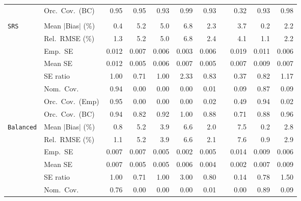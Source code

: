 \begin{landscape}
\begin{longtable}{llrrrrrrrrr}
 & Orc.\ Cov.\ (BC) & \cellcolor{rankone}0.95 & \cellcolor{rankone}0.95 & \cellcolor{ranktwo}0.93 & 0.99 & \cellcolor{ranktwo}0.93 &  & 0.32 & \cellcolor{ranktwo}0.93 & \cellcolor{rankthree}0.98 \\
\addlinespace[2pt]
\multicolumn{11}{l}{\textbf{Interaction}} \\
\addlinespace[2pt]
\quad \texttt{SRS} & Mean $|$Bias$|$ (\%) & \cellcolor{ranktwo}0.4 & 5.2 & 5.0 & 6.8 & 2.3 &  & 3.7 & \cellcolor{rankone}0.2 & \cellcolor{rankthree}2.2 \\
 & Rel.\ RMSE (\%) & \cellcolor{ranktwo}1.3 & 5.2 & 5.0 & 6.8 & 2.4 &  & 4.1 & \cellcolor{rankone}1.1 & \cellcolor{rankthree}2.2 \\
 & Emp.\ SE & 0.012 & 0.007 & 0.006 & 0.003 & 0.006 &  & 0.019 & 0.011 & 0.006 \\
 & Mean SE & 0.012 & 0.005 & 0.006 & 0.007 & 0.005 &  & 0.007 & 0.009 & 0.007 \\
 & SE ratio & \cellcolor{rankone}1.00 & 0.71 & \cellcolor{rankone}1.00 & 2.33 & \cellcolor{ranktwo}0.83 &  & 0.37 & \cellcolor{rankthree}0.82 & \cellcolor{ranktwo}1.17 \\
 & Nom.\ Cov. & \cellcolor{rankone}0.94 & 0.00 & 0.00 & 0.00 & 0.01 &  & \cellcolor{rankthree}0.09 & \cellcolor{ranktwo}0.87 & \cellcolor{rankthree}0.09 \\
 & Orc.\ Cov.\ (Emp) & \cellcolor{rankone}0.95 & 0.00 & 0.00 & 0.00 & 0.02 &  & \cellcolor{rankthree}0.49 & \cellcolor{ranktwo}0.94 & 0.02 \\
 & Orc.\ Cov.\ (BC) & \cellcolor{rankone}0.94 & 0.82 & \cellcolor{ranktwo}0.92 & \cellcolor{rankthree}1.00 & 0.88 &  & 0.71 & 0.88 & \cellcolor{rankone}0.96 \\
\addlinespace[2pt]
\quad \texttt{Balanced} & Mean $|$Bias$|$ (\%) & \cellcolor{ranktwo}0.8 & 5.2 & 3.9 & 6.6 & \cellcolor{rankthree}2.0 &  & 7.5 & \cellcolor{rankone}0.2 & 2.8 \\
 & Rel.\ RMSE (\%) & \cellcolor{ranktwo}1.1 & 5.2 & 3.9 & 6.6 & \cellcolor{rankthree}2.1 &  & 7.6 & \cellcolor{rankone}0.9 & 2.9 \\
 & Emp.\ SE & 0.007 & 0.007 & 0.005 & 0.002 & 0.005 &  & 0.014 & 0.009 & 0.006 \\
 & Mean SE & 0.007 & 0.005 & 0.005 & 0.006 & 0.004 &  & 0.002 & 0.007 & 0.009 \\
 & SE ratio & \cellcolor{rankone}1.00 & 0.71 & \cellcolor{rankone}1.00 & 3.00 & \cellcolor{ranktwo}0.80 &  & 0.14 & \cellcolor{rankthree}0.78 & 1.50 \\
 & Nom.\ Cov. & \cellcolor{ranktwo}0.76 & 0.00 & 0.00 & 0.00 & 0.01 &  & 0.00 & \cellcolor{rankone}0.89 & \cellcolor{rankthree}0.09 \\

\end{longtable}
\end{landscape}
